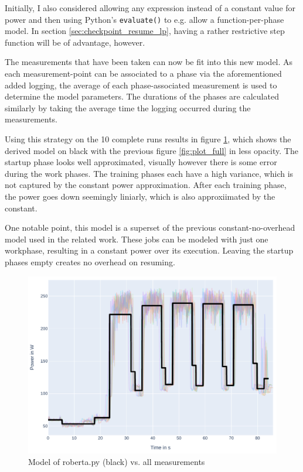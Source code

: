 Initially, I also considered allowing any expression instead of a constant value for power and then using Python's \verb|evaluate()| to e.g. allow a function-per-phase model.
In section \ref{sec:checkpoint_resume_lp}, having a rather restrictive step function will be of advantage, however. 


The measurements that have been taken can now be fit into this new model. 
As each measurement-point can be associated to a phase via the aforementioned added logging, the average of each phase-associated measurement is used to determine the model parameters. 
The durations of the phases are calculated similarly by taking the average time the logging occurred during the measurements.

Using this strategy on the 10 complete runs results in figure \ref{fig:model_overlaid}, which shows the derived model on black with the previous figure \ref{fig:plot_full} in less opacity. 
The startup phase looks well approximated, visually however there is some error during the work phases.
The training phases each have a high variance, which is not captured by the constant power approximation. After each training  phase, the power goes down seemingly liniarly, which is also approxiimated by the constant.

One notable point, this model is a superset of the previous constant-no-overhead model used in the related work.
These jobs can be modeled with just one workphase, resulting in a constant power over its execution. Leaving the startup phases empty creates no overhead on resuming.

\begin{figure}
    \includegraphics[width=\linewidth]{power-measurements/model_overlaid.pdf}
    \caption{Model of roberta.py (black) vs. all measurements}
    \label{fig:model_overlaid}
\end{figure}

